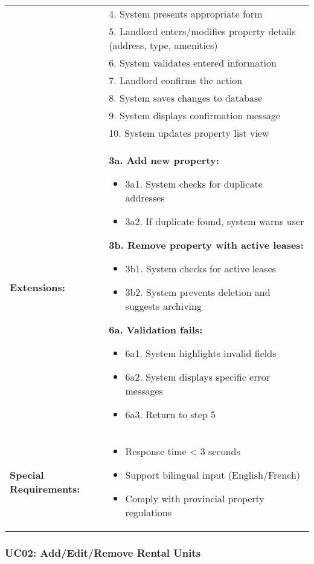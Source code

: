 \documentclass[12pt]{article}
\begin{document}
\begin{longtable}{|p{3cm}|p{11cm}|}
& 4. System presents appropriate form \\
& 5. Landlord enters/modifies property details (address, type, amenities) \\
& 6. System validates entered information \\
& 7. Landlord confirms the action \\
& 8. System saves changes to database \\
& 9. System displays confirmation message \\
& 10. System updates property list view \\
\hline
\textbf{Extensions:} & 
\textbf{3a. Add new property:}
\begin{itemize}
    \item 3a1. System checks for duplicate addresses
    \item 3a2. If duplicate found, system warns user
\end{itemize}
\textbf{3b. Remove property with active leases:}
\begin{itemize}
    \item 3b1. System checks for active leases
    \item 3b2. System prevents deletion and suggests archiving
\end{itemize}
\textbf{6a. Validation fails:}
\begin{itemize}
    \item 6a1. System highlights invalid fields
    \item 6a2. System displays specific error messages
    \item 6a3. Return to step 5
\end{itemize} \\
\hline
\textbf{Special Requirements:} & 
\begin{itemize}
    \item Response time < 3 seconds
    \item Support bilingual input (English/French)
    \item Comply with provincial property regulations
\end{itemize} \\
\hline
\end{longtable}

\subsubsection{UC02: Add/Edit/Remove Rental Units}
\end{document}
